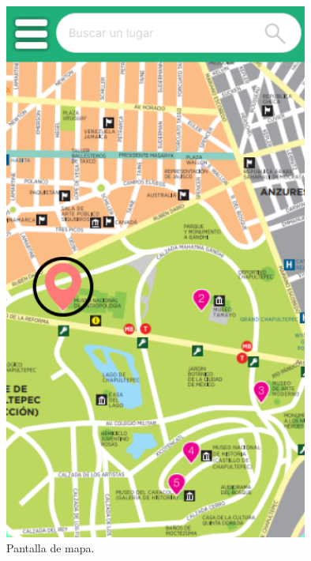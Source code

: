 \begin{figure}[htb]
    \centering
    \includegraphics[width=10cm]{pantalla5.png}
    \caption{Pantalla de mapa.}
    \label{fig:enter-label}
\end{figure}

